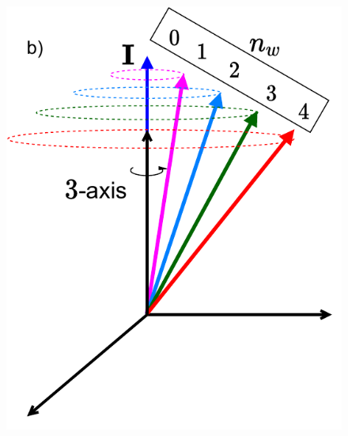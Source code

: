 \documentclass{beamer}
\begin{document}
\begin{frame}
\begin{figure}
    \includegraphics[scale=0.35]{Figs/wobbling_n_schematic-2.pdf}
  \end{figure}
\end{frame}
\end{document}
